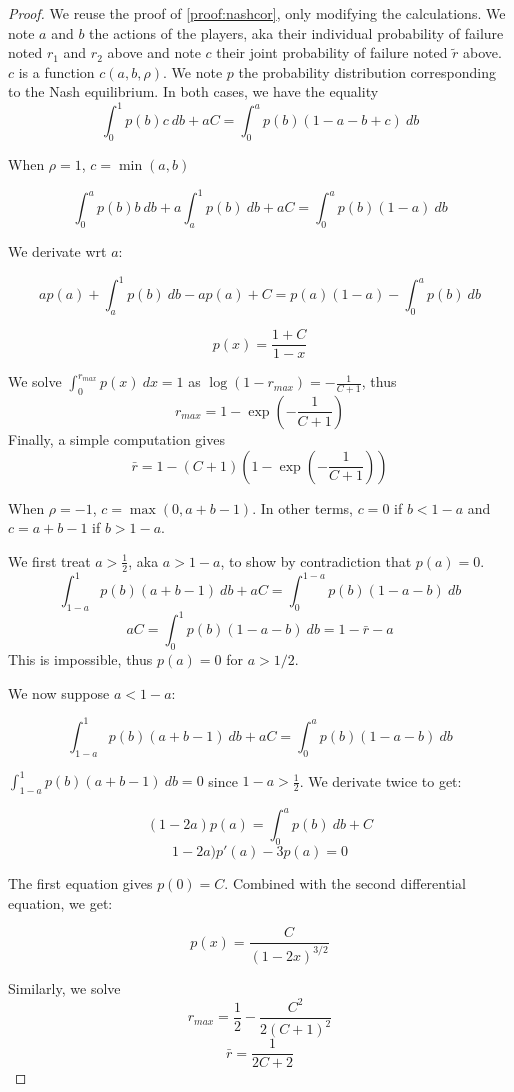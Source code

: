 \documentclass[preprint,12pt,authoryear]{elsarticle}
\theoremstyle{definition}
\begin{document}
\nashwithcor*
\begin{proof}
        We reuse the proof of \ref{proof:nashcor}, only modifying the calculations.
    We note $a$ and $b$ the actions of the players, aka their individual probability of failure noted $r_1$ and $r_2$ above and note $c$ their joint probability of failure noted $\tilde r$ above. $c$ is a function $c(a,b,\rho)$. We note $p$ the probability distribution corresponding to the Nash equilibrium.
    In both cases, we have the equality $$\int_0^1 p(b) c~db + a C = \int_0^a p(b)(1-a-b+c)~db$$

    When $\rho = 1$, $c = \min(a, b)$

    $$\int_0^a p(b) b~db + a \int_a^1 p(b)~db + a C = \int_0^a p(b)(1-a)~db$$

    We derivate wrt $a$:

    $$a p(a) + \int_a^1 p(b)~db - ap(a) + C = p(a)(1-a) - \int_0^a p(b)~db$$

    $$p(x) = \frac{1+C}{1-x}$$

    We solve $\int_0^{r_{max}} p(x)~dx=1$ as $\log(1-r_{max}) = -\frac{1}{C+1}$, thus
    $$r_{max} = 1 - \exp\left(-\frac{1}{C+1}\right)$$
    Finally, a simple computation gives $$\bar r = 1 - (C+1)\left(1-\exp\left(-\frac{1}{C+1}\right)\right)$$
    
    

    When $\rho = -1$, $c = \max(0, a+b-1)$. In other terms, $c=0$ if $b<1-a$ and $c=a+b-1$ if $b>1-a$.

    We first treat $a>\frac{1}{2}$, aka $a>1-a$, to show by contradiction that $p(a) = 0$.
    $$\int_{1-a}^1 p(b)(a+b-1)~db+ aC = \int_0^{1-a} p(b)(1-a-b)~db$$
    $$aC = \int_0^1 p(b)(1-a-b)~db = 1 - \bar r - a$$
    This is impossible, thus $p(a) = 0$ for $a> 1/2$.

    We now suppose $a < 1-a$:

    $$\int_{1-a}^1 p(b)(a+b-1)~db + aC = \int_0^a p(b) (1-a-b)~db$$

    $\int_{1-a}^1 p(b)(a+b-1)~db = 0$ since $1-a >  \frac12$.
    We derivate twice to get:

    $$(1-2a)p(a) = \int_0^a p(b)~db + C$$
    $$1-2a) p'(a) - 3p(a) = 0$$

    The first equation gives $p(0) = C$. Combined with the second differential equation, we get:

    $$p(x) =\frac{C}{(1-2x)^{3/2}}$$

    Similarly, we solve  $$r_{max} = \frac{1}{2} - \frac{C^2}{2(C+1)^2}$$
    $$\bar r = \frac{1}{2C+2}$$
\end{proof}
\end{document}
